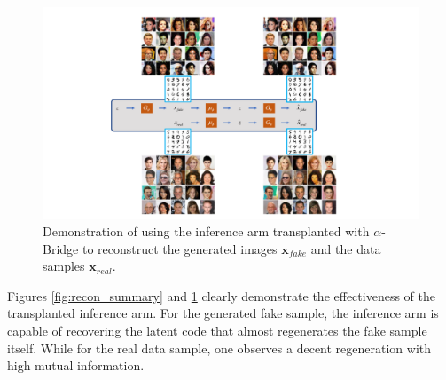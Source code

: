 \documentclass[letterpaper]{article} %
\newcommand{\xv}[0]{\ensuremath{\boldsymbol{x}} }
\begin{document}
\begin{figure}[H]
	\begin{center}
		\includegraphics[width=1.0 \columnwidth]{Figures/GenProcessRecon}
		\caption{\small Demonstration of using the inference arm transplanted with $\alpha$-Bridge to reconstruct the generated images $\xv_{fake}$ and the data samples $\xv_{real}$. 
		}
		\label{fig:recon_process}
	\end{center}
\end{figure}

Figures \ref{fig:recon_summary} and \ref{fig:recon_process} clearly demonstrate the effectiveness of the transplanted inference arm. For the generated fake sample, the inference arm is capable of recovering the latent code that almost regenerates the fake sample itself. While for the real data sample, one observes a decent regeneration with high mutual information.
\end{document}
